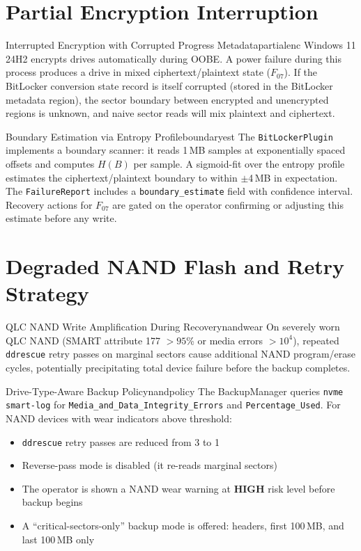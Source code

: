 \documentclass[11pt,a4paper]{report}
\begin{document}
\section{Partial Encryption Interruption}

\begin{edgecase}{Interrupted Encryption with Corrupted Progress Metadata}{partialenc}
Windows 11 24H2 encrypts drives automatically during OOBE. A power failure during this process produces a drive in mixed ciphertext/plaintext state ($F_{07}$). If the BitLocker conversion state record is itself corrupted (stored in the BitLocker metadata region), the sector boundary between encrypted and unencrypted regions is unknown, and naive sector reads will mix plaintext and ciphertext.
\end{edgecase}

\begin{solution}{Boundary Estimation via Entropy Profile}{boundaryest}
The \texttt{BitLockerPlugin} implements a boundary scanner: it reads 1\,MB samples at exponentially spaced offsets and computes $H(B)$ per sample. A sigmoid-fit over the entropy profile estimates the ciphertext/plaintext boundary to within $\pm$4\,MB in expectation. The \texttt{FailureReport} includes a \texttt{boundary\_estimate} field with confidence interval. Recovery actions for $F_{07}$ are gated on the operator confirming or adjusting this estimate before any write.
\end{solution}

\section{Degraded NAND Flash and Retry Strategy}

\begin{edgecase}{QLC NAND Write Amplification During Recovery}{nandwear}
On severely worn QLC NAND (SMART attribute 177 $> 95$\% or media errors $> 10^4$), repeated \texttt{ddrescue} retry passes on marginal sectors cause additional NAND program/erase cycles, potentially precipitating total device failure before the backup completes.
\end{edgecase}

\begin{solution}{Drive-Type-Aware Backup Policy}{nandpolicy}
The BackupManager queries \texttt{nvme smart-log} for \texttt{Media\_and\_Data\_Integrity\_Errors} and \texttt{Percentage\_Used}. For NAND devices with wear indicators above threshold:
\begin{itemize}[noitemsep]
  \item \texttt{ddrescue} retry passes are reduced from 3 to 1
  \item Reverse-pass mode is disabled (it re-reads marginal sectors)
  \item The operator is shown a NAND wear warning at \textbf{HIGH} risk level before backup begins
  \item A ``critical-sectors-only'' backup mode is offered: headers, first 100\,MB, and last 100\,MB only
\end{itemize}
\end{solution}
\end{document}
